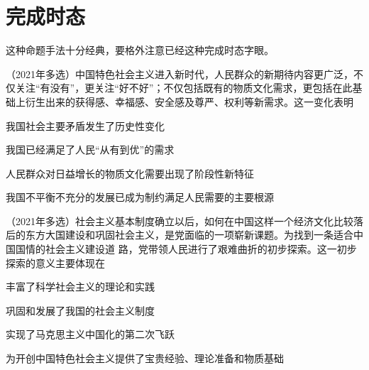 \documentclass[lang=cn,blue,10pt,scheme=chinese,twocol]{zznote}
\begin{document}
\section{完成时态}
\begin{definition}
	这种命题手法十分经典，要格外注意{\color{red}已经}这种完成时态字眼。
\end{definition}

\begin{example} （2021年多选）中国特色社会主义进入新时代，人民群众的新期待内容更广泛，不仅关注“有没有”，更关注“好不好”；不仅包括既有的物质文化需求，更包括在此基础上衍生出来的获得感、幸福感、安全感及尊严、权利等新需求。这一变化表明
	\begin{choice}
		\item 我国社会主要矛盾发生了历史性变化
		\item 我国已经满足了人民“从有到优”的需求
		\item 人民群众对日益增长的物质文化需要出现了阶段性新特征
		\item 我国不平衡不充分的发展已成为制约满足人民需要的主要根源
	\end{choice}
\end{example}

\begin{example}
	（2021年多选）社会主义基本制度确立以后，如何在中国这样一个经济文化比较落后的东方大国建设和巩固社会主义，是党面临的一项崭新课题。为找到一条适合中国国情的社会主义建设道  路，党带领人民进行了艰难曲折的初步探索。这一初步探索的意义主要体现在
	\begin{choice}
		\item 丰富了科学社会主义的理论和实践
		\item 巩固和发展了我国的社会主义制度
		\item 实现了马克思主义中国化的第二次飞跃
		\item 为开创中国特色社会主义提供了宝贵经验、理论准备和物质基础
	\end{choice}
\end{example}
\end{document}
